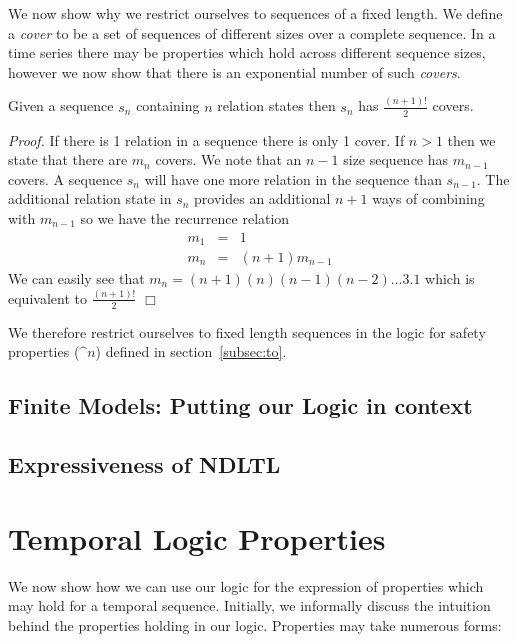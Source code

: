 We now show why we restrict ourselves to sequences of a fixed
length. We define a {\em cover} to be a set of sequences of different
sizes over a complete sequence. In a time series there may be
properties which hold across different sequence sizes, however we now
show that there is an exponential number of such {\em covers}.

\begin{lemma}\label{lemma:covernum}
\begin{rm}
Given a sequence $s_n$ containing $n$ relation states then $s_n$ has
$\frac{(n+1)!}{2}$ covers.
\end{rm}
\end{lemma}

{\em Proof.} If there is 1 relation in a sequence there is only 1
cover.  If $n > 1$
then we state that there are $m_n$ covers.  We note that an $n-1$ size
sequence has $m_{n-1}$ covers. A sequence $s_n$ will have one more
relation in the sequence than $s_{n-1}$. The additional relation state in
$s_n$ provides an additional $n+1$ ways of combining with $m_{n-1}$ so
we have the recurrence relation
\begin{eqnarray*}
	m_1	& = & 1 \\
	m_n	& = & (n+1)m_{n-1}
\end{eqnarray*}
We can easily see that $m_n = (n+1)(n)(n-1)(n-2) \ldots 3.1$
which is equivalent to $\frac{(n+1)!}{2}$  $\Box$

\medskip

We therefore restrict ourselves to fixed length sequences in the logic
for safety properties ($\bm^n$) defined in section~\ref{subsec:to}.


\subsection{Finite Models: Putting our Logic in context}

\subsection{Expressiveness of NDLTL}


\section{Temporal Logic Properties}\label{sec:tl_properties}


We now show how we can use our logic for the expression of properties
which may hold for a temporal sequence. Initially, we informally
discuss the intuition behind the properties holding in our logic.
Properties may take numerous forms:

